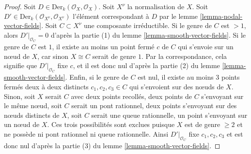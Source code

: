 \begin{proof}
Soit $D \in \text{Der}_k(\mathcal{O}_X, \mathcal{O}_X)$. Soit $X^\nu$ la normalisation de $X$. Soit $D' \in \text{Der}_k(\mathcal{O}_{X^\nu}, \mathcal{O}_{X^\nu})$ l'élément correspondant à $D$ par le lemme \ref{lemma-nodal-vector-fields}. Soit $C \subset X^\nu$ une composante irréductible. Si le genre de $C$ est $> 1$, alors $D'|_{\mathcal{O}_C} = 0$ d'après la partie (1) du lemme \ref{lemma-smooth-vector-fields}. Si le genre de $C$ est $1$, il existe au moins un point fermé $c$ de $C$ qui s'envoie sur un nœud de $X$, car sinon $X \cong C$ serait de genre $1$. Par la correspondance, cela signifie que $D'|_{\mathcal{O}_C}$ fixe $c$, et il est donc nul d'après la partie (2) du lemme \ref{lemma-smooth-vector-fields}. Enfin, si le genre de $C$ est nul, il existe au moins $3$ points fermés deux à deux distincts $c_1, c_2, c_3 \in C$ qui s'envoient sur des nœuds de $X$. Sinon, soit $X$ serait $C$ avec deux points recollés, deux points de $C$ s'envoyant sur le même nœud, soit $C$ serait un pont rationnel, deux points s'envoyant sur des nœuds distincts de $X$, soit $C$ serait une queue rationnelle, un point s'envoyant sur un nœud de $X$. Ces trois possibilités sont exclues puisque $X$ est de genre $\geq 2$ et ne possède ni pont rationnel ni queue rationnelle. Ainsi $D'|_{\mathcal{O}_C}$ fixe $c_1, c_2, c_3$ et est donc nul d'après la partie (3) du lemme \ref{lemma-smooth-vector-fields}.
\end{proof}











